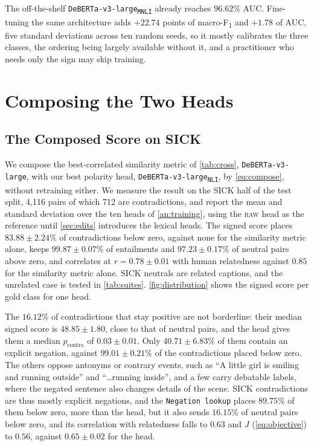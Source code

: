\documentclass[11pt]{article}
\begin{document}
The off-the-shelf \texttt{DeBERTa-v3-large\textsubscript{MNLI}} already reaches $96.62\%$ AUC.
Fine-tuning the same architecture adds $+22.74$ points of macro-F\textsubscript{1} and $+1.78$ of AUC, five standard deviations across ten random seeds, so it mostly calibrates the three classes, the ordering being largely available without it, and a practitioner who needs only the sign may skip training.

\section{Composing the Two Heads}
\label{sec:composition}

\subsection{The Composed Score on SICK}

We compose the best-correlated similarity metric of \autoref{tab:cross}, \texttt{DeBERTa-v3-large}, with our best polarity head, \texttt{DeBERTa-v3-large\textsubscript{NLI}}, by \autoref{eq:compose}, without retraining either.
We measure the result on the SICK half of the test split, 4{,}116 pairs of which 712 are contradictions, and report the mean and standard deviation over the ten heads of \autoref{an:training}, using the \textsc{raw} head as the reference until \autoref{sec:edits} introduces the lexical heads.
The signed score places $83.88 \pm 2.24\%$ of contradictions below zero, against none for the similarity metric alone, keeps $99.87 \pm 0.07\%$ of entailments and $97.23 \pm 0.17\%$ of neutral pairs above zero, and correlates at $r = 0.78 \pm 0.01$ with human relatedness against $0.85$ for the similarity metric alone.
SICK neutrals are related captions, and the unrelated case is tested in \autoref{tab:suites}. \autoref{fig:distribution} shows the signed score per gold class for one head.



The $16.12\%$ of contradictions that stay positive are not borderline: their median signed score is $48.85 \pm 1.80$, close to that of neutral pairs, and the head gives them a median $p_{\mathrm{contra}}$ of $0.03 \pm 0.01$.
Only $40.71 \pm 6.83\%$ of them contain an explicit negation, against $99.01 \pm 0.21\%$ of the contradictions placed below zero.
The others oppose antonyms or contrary events, such as ``A little girl is smiling and running outside'' and ``\ldots running inside'', and a few carry debatable labels, where the negated sentence also changes details of the scene.
SICK contradictions are thus mostly explicit negations, and the \texttt{Negation lookup} places $89.75\%$ of them below zero, more than the head, but it also sends $16.15\%$ of neutral pairs below zero, and its correlation with relatedness falls to $0.63$ and $J$ (\autoref{eq:objective}) to $0.56$, against $0.65 \pm 0.02$ for the head.
\end{document}
